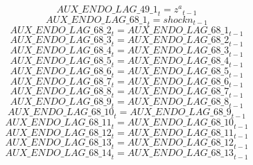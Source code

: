 \begin{dmath}
{AUX\_ENDO\_LAG\_49\_1}_{t}={{z^a}}_{t-1}
\end{dmath}
\begin{dmath}
{AUX\_ENDO\_LAG\_68\_1}_{t}={{shockn}}_{t-1}
\end{dmath}
\begin{dmath}
{AUX\_ENDO\_LAG\_68\_2}_{t}={AUX\_ENDO\_LAG\_68\_1}_{t-1}
\end{dmath}
\begin{dmath}
{AUX\_ENDO\_LAG\_68\_3}_{t}={AUX\_ENDO\_LAG\_68\_2}_{t-1}
\end{dmath}
\begin{dmath}
{AUX\_ENDO\_LAG\_68\_4}_{t}={AUX\_ENDO\_LAG\_68\_3}_{t-1}
\end{dmath}
\begin{dmath}
{AUX\_ENDO\_LAG\_68\_5}_{t}={AUX\_ENDO\_LAG\_68\_4}_{t-1}
\end{dmath}
\begin{dmath}
{AUX\_ENDO\_LAG\_68\_6}_{t}={AUX\_ENDO\_LAG\_68\_5}_{t-1}
\end{dmath}
\begin{dmath}
{AUX\_ENDO\_LAG\_68\_7}_{t}={AUX\_ENDO\_LAG\_68\_6}_{t-1}
\end{dmath}
\begin{dmath}
{AUX\_ENDO\_LAG\_68\_8}_{t}={AUX\_ENDO\_LAG\_68\_7}_{t-1}
\end{dmath}
\begin{dmath}
{AUX\_ENDO\_LAG\_68\_9}_{t}={AUX\_ENDO\_LAG\_68\_8}_{t-1}
\end{dmath}
\begin{dmath}
{AUX\_ENDO\_LAG\_68\_10}_{t}={AUX\_ENDO\_LAG\_68\_9}_{t-1}
\end{dmath}
\begin{dmath}
{AUX\_ENDO\_LAG\_68\_11}_{t}={AUX\_ENDO\_LAG\_68\_10}_{t-1}
\end{dmath}
\begin{dmath}
{AUX\_ENDO\_LAG\_68\_12}_{t}={AUX\_ENDO\_LAG\_68\_11}_{t-1}
\end{dmath}
\begin{dmath}
{AUX\_ENDO\_LAG\_68\_13}_{t}={AUX\_ENDO\_LAG\_68\_12}_{t-1}
\end{dmath}
\begin{dmath}
{AUX\_ENDO\_LAG\_68\_14}_{t}={AUX\_ENDO\_LAG\_68\_13}_{t-1}
\end{dmath}
